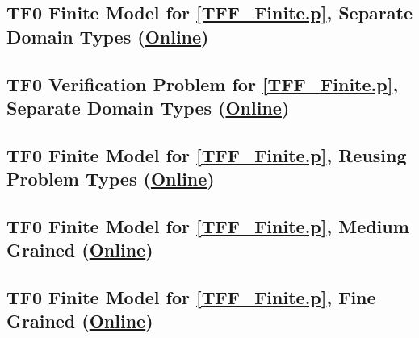 \documentclass{easychair}
\begin{document}
\newpage
\subsection{TF0 Finite Model for \ref{TFF_Finite.p}, Separate Domain Types
(\href{https://raw.githubusercontent.com/GeoffsPapers/InterpretationFormat/master/Examples/TFF_Finite_SeparateDomains.s}{Online})}
\label{TFF_Finite_SeparateDomains.s}
\begin{small}

\end{small}

\newpage
\subsection{TF0 Verification Problem for \ref{TFF_Finite.p}, Separate Domain Types
(\href{https://raw.githubusercontent.com/GeoffsPapers/InterpretationFormat/master/Examples/TFF_Finite.s.p}{Online})}
\label{TFF_Finite.s.p}
\begin{small}

\end{small}

\newpage
\subsection{TF0 Finite Model for \ref{TFF_Finite.p}, Reusing Problem Types
(\href{https://raw.githubusercontent.com/GeoffsPapers/InterpretationFormat/master/Examples/TFF_Finite.s}{Online})}
\label{TFF_Finite.s}
\begin{small}

\end{small}

\newpage
\subsection{TF0 Finite Model for \ref{TFF_Finite.p}, Medium Grained
(\href{https://raw.githubusercontent.com/GeoffsPapers/InterpretationFormat/master/Examples/TFF_Finite_Medium.s}{Online})}
\label{TFF_Finite_Medium.s}
\begin{small}

\end{small}

\newpage
\subsection{TF0 Finite Model for \ref{TFF_Finite.p}, Fine Grained
(\href{https://raw.githubusercontent.com/GeoffsPapers/InterpretationFormat/master/Examples/TFF_Finite_Fine.s}{Online})}
\label{TFF_Finite_Fine.s}
\begin{small}

\end{small}
\end{document}
